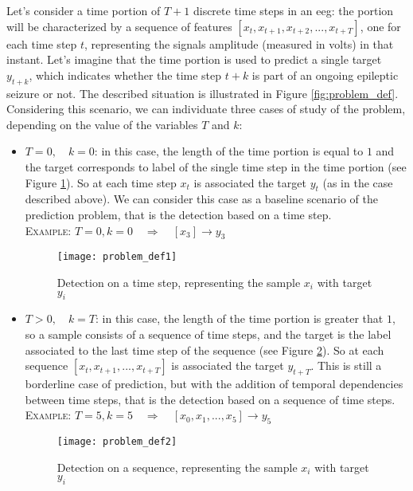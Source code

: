 Let's consider a time portion of $T+1$ discrete time steps in an \acs{eeg}: the portion will be characterized by a sequence of features $[x_t, x_{t+1}, x_{t+2}, ... , x_{t+T}]$, one for each time step $t$, representing the signals amplitude (measured in volts) in that instant. Let's imagine that the time portion is used to predict a single target $y_{t+k}$, which indicates whether the time step $t+k$ is part of an ongoing epileptic seizure or not. The described situation is illustrated in Figure \ref{fig:problem_def}. Considering this scenario, we can individuate three cases of study of the problem, depending on the value of the variables $T$ and $k$:
\begin{itemize}
    \item $T=0,\quad k=0$: in this case, the length of the time portion is equal to $1$ and the target corresponds to label of the single time step in the time portion (see Figure \ref{fig:problem_def1}). So at each time step $x_t$ is associated the target $y_t$ (as in the case described above). We can consider this case as a baseline scenario of the prediction problem, that is the detection based on a time step.\\
    \textsc{Example:} \quad$T=0, k=0\quad \Rightarrow{}\quad [x_3] \rightarrow{} y_3$
    \begin{figure}[h]
        \centering
        \texttt{[image: problem\_def1]}
        \caption{Detection on a time step, representing the sample $x_i$ with target $y_i$}
        \label{fig:problem_def1}
    \end{figure}
    \item $T>0,\quad k=T$: in this case, the length of the time portion is greater that $1$, so a sample consists of a sequence of time steps, and the target is the label associated to the last time step of the sequence (see Figure \ref{fig:problem_def2}). So at each sequence $[x_t, x_{t+1}, ... , x_{t+T}]$ is associated the target $y_{t+T}$. This is still a borderline case of prediction, but with the addition of temporal dependencies between time steps, that is the detection based on a sequence of time steps.\\
    \textsc{Example:} \quad$T=5, k=5\quad \Rightarrow{}\quad [x_0, x_1, ..., x_5] \rightarrow{} y_5$
    \begin{figure}[h]
        \centering
        \texttt{[image: problem\_def2]}
        \caption{Detection on a sequence, representing the sample $x_i$ with target $y_i$}
        \label{fig:problem_def2}
    \end{figure}

\end{itemize}
